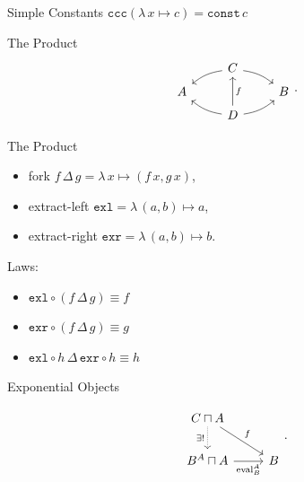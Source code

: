 \documentclass[10pt]{beamer}
\newcommand{\exl}{\mathtt{exl}}
\newcommand{\exr}{\mathtt{exr}}
\newcommand{\lamf}[2]{\ensuremath{\lambda\, #1 \mapsto #2}}
\newcommand{\ccc}{\ensuremath{\mathtt{ccc}}}
\newcommand{\lamtoccc}[1]{\ensuremath{\ccc (#1)}}
\newcommand{\delprod}[2]{\ensuremath{#1\,\Delta\,#2}}
\newcommand{\const}{\ensuremath{\mathtt{const}}}
\theoremstyle{definition}
\theoremstyle{remark}
\numberwithin{equation}{section}
\begin{document}
\begin{frame}[fragile]{Simple Constants}
  $\lamtoccc{\lamf{x}{c}} = \const\, c$
\end{frame}

\begin{frame}[fragile]{The Product}
  \[
    \begin{tikzcd}[row sep=tiny]
       & C \arrow[bend right=15]{dl} \arrow[bend left=15]{dr} & \\
      A & & B \\
       & D \arrow[bend left=15]{ul} \arrow[swap]{uu}{f} \arrow[bend right=15]{ur} & 
    \end{tikzcd}\rlap{.}
  \]
\end{frame}

\begin{frame}[fragile]{The Product}
  \begin{itemize}
  \item fork $\delprod{f}{g} = \lamf{x}{(f\,x,g\,x)}$,
  \item extract-left $\exl = \lamf{(a,b)}{a}$,
  \item extract-right $\exr = \lamf{(a,b)}{b}$.
  \end{itemize}
  
  Laws:\\
  \begin{itemize}
  \item $\exl\circ(\delprod{f}{g}) \equiv f$
  \item $\exr\circ(\delprod{f}{g}) \equiv g$
  \item $\delprod{\exl\circ h}{\exr\circ h} \equiv h$
  \end{itemize}
\end{frame}

\begin{frame}[fragile]{Exponential Objects}
  \begin{center}
    \[
    \begin{tikzcd}
      C \sqcap A \arrow[swap,densely dotted]{d}{\exists!} \arrow{dr}{f} & \\
      B^A \sqcap A \arrow[swap]{r}{\mathrm{eval}_B^A} & B
    \end{tikzcd}\rlap{.}
    \]
  \end{center}
\end{frame}
\end{document}

